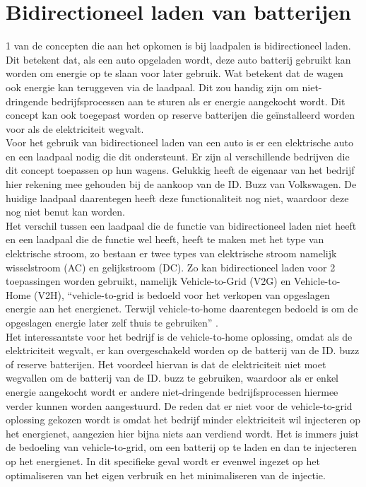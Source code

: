 \section{Bidirectioneel laden van batterijen}
\label{sec:stand-van-zaken-bidirectioneel-laden}

1 van de concepten die aan het opkomen is bij laadpalen is bidirectioneel laden. Dit betekent dat, als een auto opgeladen wordt, deze auto batterij gebruikt kan worden om energie op te slaan voor later gebruik. Wat betekent dat de wagen ook energie kan teruggeven via de laadpaal. Dit zou handig zijn om niet-dringende bedrijfsprocessen aan te sturen als er energie aangekocht wordt. Dit concept kan ook toegepast worden op reserve batterijen die geïnstalleerd worden voor als de elektriciteit wegvalt.\\

Voor het gebruik van bidirectioneel laden van een auto is er een elektrische auto en een laadpaal nodig die dit ondersteunt. Er zijn al verschillende bedrijven die dit concept toepassen op hun wagens. Gelukkig heeft de eigenaar van het bedrijf hier rekening mee gehouden bij de aankoop van de ID. Buzz van Volkswagen. De huidige laadpaal daarentegen heeft deze functionaliteit nog niet, waardoor deze nog niet benut kan worden.\\

Het verschil tussen een laadpaal die de functie van bidirectioneel laden niet heeft en een laadpaal die de functie wel heeft, heeft te maken met het type van elektrische stroom, zo bestaan er twee types van elektrische stroom namelijk wisselstroom (AC) en gelijkstroom (DC). Zo kan bidirectioneel laden voor 2 toepassingen worden gebruikt, namelijk Vehicle-to-Grid (V2G) en Vehicle-to-Home (V2H), “vehicle-to-grid is bedoeld voor het verkopen van opgeslagen energie aan het energienet. Terwijl vehicle-to-home daarentegen bedoeld is om de opgeslagen energie later zelf thuis te gebruiken” \autocite{LAZZERONI2019}.\\

Het interessantste voor het bedrijf is de vehicle-to-home oplossing, omdat als de elektriciteit wegvalt, er kan overgeschakeld worden op de batterij van de ID. buzz of reserve batterijen. Het voordeel hiervan is dat de elektriciteit niet moet wegvallen om de batterij van de ID. buzz te gebruiken, waardoor als er enkel energie aangekocht wordt er andere niet-dringende bedrijfsprocessen hiermee verder kunnen worden aangestuurd. De reden dat er niet voor de vehicle-to-grid oplossing gekozen wordt is omdat het bedrijf minder elektriciteit wil injecteren op het energienet, aangezien hier bijna niets aan verdiend wordt. Het is immers juist de bedoeling van vehicle-to-grid, om een batterij op te laden en dan te injecteren op het energienet. In dit specifieke geval wordt er evenwel ingezet op het optimaliseren van het eigen verbruik en het minimaliseren van de injectie.

